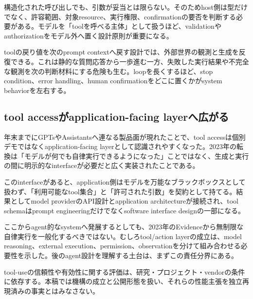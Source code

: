 構造化された呼び出しでも、引数が妥当とは限らない。そのためhost側は型だけでなく、許容範囲、対象resource、実行権限、confirmationの要否を判断する必要がある。モデルを「toolを呼べる主体」として扱うほど、validationやauthorizationをモデル外へ置く設計原則が重要になる。\autocite{src-4de1cea0a896,src-6b76b870b4ae,src-97786632d087,src-e17d0bf10781}


toolの戻り値を次のprompt contextへ戻す設計では、外部世界の観測と生成を反復できる。これは静的な質問応答から一歩進む一方、失敗した実行結果や不完全な観測を次の判断材料にする危険も生む。loopを長くするほど、stop condition、error handling、human confirmationをどこに置くかがsystem behaviorを左右する。\autocite{src-4de1cea0a896,src-6b76b870b4ae,src-97786632d087,src-e17d0bf10781}


\subsection{tool accessがapplication-facing layerへ広がる}

年末までにGPTsやAssistantsへ連なる製品面が現れたことで、tool accessは個別デモではなくapplication-facing layerとして認識されやすくなった。2023年の転換は「モデルが何でも自律実行できるようになった」ことではなく、生成と実行の間に明示的なinterfaceが必要だと広く実装されたことである。\autocite{src-4de1cea0a896,src-6b76b870b4ae,src-97786632d087,src-e17d0bf10781}


このinterfaceがあると、application側はモデルを万能なブラックボックスとして扱わず、「利用可能なtool集合」と「許可された引数」を契約として持てる。結果としてmodel providerのAPI設計とapplication architectureが接続され、tool schemaはprompt engineeringだけでなくsoftware interface designの一部になる。\autocite{src-4de1cea0a896,src-6b76b870b4ae,src-97786632d087,src-e17d0bf10781}


ここからagent的なsystemへ発展するとしても、2023年のEvidenceから無制限な自律実行を一般化するべきではない。むしろtool/action layerの成立は、model reasoning、external execution、permission、observationを分けて組み合わせる必要性を示した。後のagent設計を理解する土台は、まずこの責任分界にある。\autocite{src-150e07b331df,src-4de1cea0a896,src-6b76b870b4ae,src-97786632d087,src-e17d0bf10781}


\begin{claimboundary}
tool-useの信頼性や有効性に関する評価は、研究・プロジェクト・vendorの条件に依存する。本稿では機構の成立と公開形態を扱い、それらの性能主張を独立再現済みの事実とはみなさない。\autocite{src-4de1cea0a896,src-6b76b870b4ae,src-97786632d087,src-e17d0bf10781}
\end{claimboundary}
